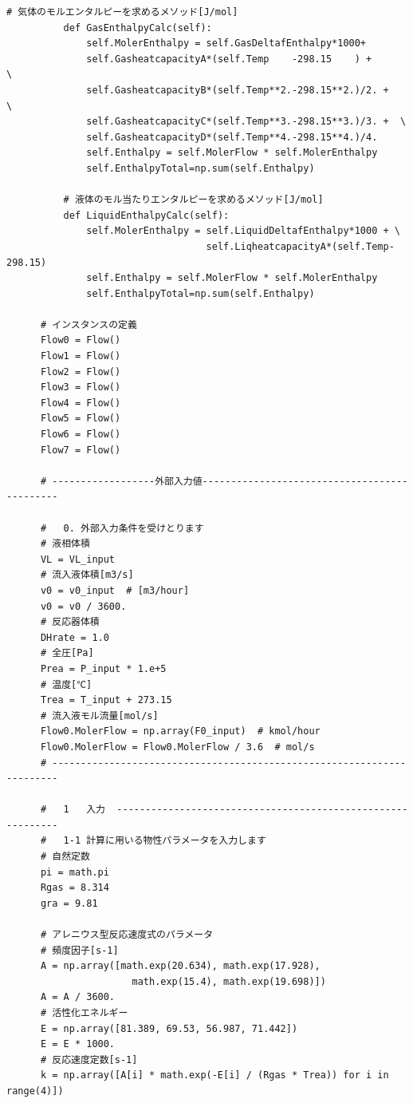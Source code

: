 \documentclass[a4j]{jsreport}
\begin{document}
\begin{lstlisting}[caption=気液反応器の解析(迅速に平衡)]
          # 気体のモルエンタルピーを求めるメソッド[J/mol]
          def GasEnthalpyCalc(self):
              self.MolerEnthalpy = self.GasDeltafEnthalpy*1000+
              self.GasheatcapacityA*(self.Temp    -298.15    ) +       \
              self.GasheatcapacityB*(self.Temp**2.-298.15**2.)/2. +   \
              self.GasheatcapacityC*(self.Temp**3.-298.15**3.)/3. +  \
              self.GasheatcapacityD*(self.Temp**4.-298.15**4.)/4.
              self.Enthalpy = self.MolerFlow * self.MolerEnthalpy
              self.EnthalpyTotal=np.sum(self.Enthalpy)

          # 液体のモル当たりエンタルピーを求めるメソッド[J/mol]
          def LiquidEnthalpyCalc(self):
              self.MolerEnthalpy = self.LiquidDeltafEnthalpy*1000 + \
                                   self.LiqheatcapacityA*(self.Temp-298.15)
              self.Enthalpy = self.MolerFlow * self.MolerEnthalpy
              self.EnthalpyTotal=np.sum(self.Enthalpy)

      # インスタンスの定義
      Flow0 = Flow()
      Flow1 = Flow()
      Flow2 = Flow()
      Flow3 = Flow()
      Flow4 = Flow()
      Flow5 = Flow()
      Flow6 = Flow()
      Flow7 = Flow()

      # ------------------外部入力値---------------------------------------------

      #   0. 外部入力条件を受けとります
      # 液相体積
      VL = VL_input
      # 流入液体積[m3/s]
      v0 = v0_input  # [m3/hour]
      v0 = v0 / 3600.
      # 反応器体積
      DHrate = 1.0
      # 全圧[Pa]
      Prea = P_input * 1.e+5
      # 温度[℃]
      Trea = T_input + 273.15
      # 流入液モル流量[mol/s]
      Flow0.MolerFlow = np.array(F0_input)  # kmol/hour
      Flow0.MolerFlow = Flow0.MolerFlow / 3.6  # mol/s
      # -----------------------------------------------------------------------

      #   1   入力  ------------------------------------------------------------
      #   1-1 計算に用いる物性パラメータを入力します
      # 自然定数
      pi = math.pi
      Rgas = 8.314
      gra = 9.81

      # アレニウス型反応速度式のパラメータ
      # 頻度因子[s-1]
      A = np.array([math.exp(20.634), math.exp(17.928),
                      math.exp(15.4), math.exp(19.698)])
      A = A / 3600.
      # 活性化エネルギー
      E = np.array([81.389, 69.53, 56.987, 71.442])
      E = E * 1000.
      # 反応速度定数[s-1]
      k = np.array([A[i] * math.exp(-E[i] / (Rgas * Trea)) for i in range(4)])


\end{lstlisting}
\end{document}
